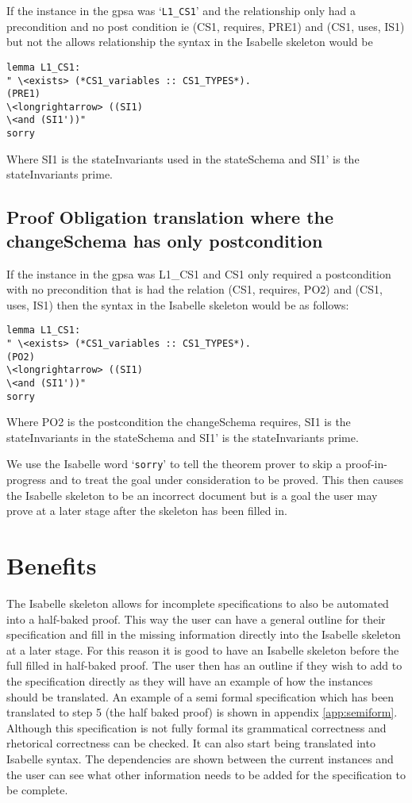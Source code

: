 If the instance in the \gls{gpsa} was `\texttt{L1\_CS1}' and the relationship only had a precondition and no post condition ie (CS1, requires, PRE1) and (CS1, uses, IS1) but not the allows relationship the syntax in the Isabelle skeleton would be 

\begin{verbatim}
lemma L1_CS1:
" \<exists> (*CS1_variables :: CS1_TYPES*).
(PRE1)
\<longrightarrow> ((SI1)
\<and (SI1'))"
sorry
\end{verbatim}

Where SI1 is the stateInvariants used in the stateSchema and SI1' is the stateInvariants prime.

\subsection{Proof Obligation translation where the changeSchema has only postcondition}

If the instance in the \gls{gpsa} was L1\_CS1 and CS1 only required a postcondition with no precondition that is had the relation (CS1, requires, PO2) and (CS1, uses, IS1) then the syntax in the Isabelle skeleton would be as follows:

\begin{verbatim}
lemma L1_CS1:
" \<exists> (*CS1_variables :: CS1_TYPES*).
(PO2)
\<longrightarrow> ((SI1)
\<and (SI1'))"
sorry
\end{verbatim}

Where PO2 is the postcondition the changeSchema requires, SI1 is the stateInvariants in the stateSchema and SI1' is the stateInvariants prime. 

We use the Isabelle word `\texttt{sorry}' to tell the theorem prover to skip a proof-in-progress and to treat the goal under consideration to be proved. This then causes the Isabelle skeleton to be an incorrect document but is a goal the user may prove at a later stage after the skeleton has been filled in.

\section{Benefits}

The Isabelle skeleton allows for incomplete specifications to also be automated into a half-baked proof. This way the user can have a general outline for their specification and fill in the missing information directly into the Isabelle skeleton at a later stage. For this reason it is good to have an Isabelle skeleton before the full filled in half-baked proof. The user then has an outline if they wish to add to the specification directly as they will have an example of how the instances should be translated. An example of a semi formal specification which has been translated to step 5 (the half baked proof) is shown in appendix \ref{app:semiform}. Although this specification is not fully formal its grammatical correctness and rhetorical correctness can be checked. It can also start being translated into Isabelle syntax. The dependencies are shown between the current instances and the user can see what other information needs to be added for the specification to be complete.


